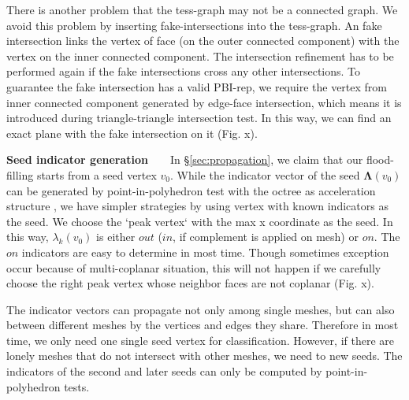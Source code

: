 \documentclass[10pt,journal,compsoc]{IEEEtran}
\begin{document}
\vspace{0.5em}\noindent There is another problem that the tess-graph may not be a connected graph. We avoid this problem by inserting fake-intersections into the tess-graph. An fake intersection links the vertex of face (on the outer connected component) with the vertex on the inner connected component. The intersection refinement has to be performed again if the fake intersections cross any other intersections. To guarantee the fake intersection has a valid PBI-rep, we require the vertex from inner connected component generated by edge-face intersection, which means it is introduced during triangle-triangle intersection test. In this way, we can find an exact plane with the fake intersection on it (Fig. x).

\vspace{0.5em}
\noindent\textbf{Seed indicator generation}~~~~In \S\ref{sec:propagation}, we claim that our flood-filling starts from a seed vertex $v_0$. While the indicator vector of the seed $\bm{\Lambda}(v_0)$ can be generated by point-in-polyhedron test \cite{ogayar2005point} with the octree as acceleration structure \cite{frisken2002simple}, we have simpler strategies by using vertex with known indicators as the seed. We choose the `peak vertex` with the max x coordinate as the seed. In this way, $\lambda_k(v_0)$ is either $out$ ($in$, if complement is applied on mesh) or $on$. The $on$ indicators are easy to determine in most time. Though sometimes exception occur because of multi-coplanar situation, this will not happen if we carefully choose the right peak vertex whose neighbor faces are not coplanar (Fig. x).

\vspace{0.5em}\noindent The indicator vectors can propagate not only among single meshes, but can also between different meshes by the vertices and edges they share. Therefore in most time, we only need one single seed vertex for classification. However, if there are lonely meshes that do not intersect with other meshes, we need to new seeds. The indicators of the second and later seeds can only be computed by point-in-polyhedron tests.

\end{document}

